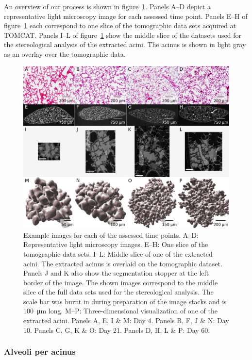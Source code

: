 \documentclass[
  american,
]{article}
\begin{document}
An overview of our process is shown in figure~\ref{fig:01}.
Panels A--D depict a representative light microscopy image for each assessed time point.
Panels E--H of figure~\ref{fig:01} each correspond to one slice of the tomographic data sets acquired at TOMCAT.
Panels I--L of figure~\ref{fig:01} show the middle slice of the datasets used for the stereological analysis of the extracted acini.
The acinus is shown in light gray as an overlay over the tomographic data.

\begin{figure}
\hypertarget{fig:01}{%
\centering
\includegraphics{images/fig01.png}
\caption{Example images for each of the assessed time points.
A--D: Representative light microscopy images.
E--H: One slice of the tomographic data sets.
I--L: Middle slice of one of the extracted acini.
The extracted acinus is overlaid on the tomographic dataset.
Panels J and K also show the segmentation stopper at the left border of the image.
The shown images correspond to the middle slice of the full data sets used for the stereological analysis.
The scale bar was burnt in during preparation of the image stacks and is 100~μm long.
M--P: Three-dimensional visualization of one of the extracted acini.
Panels A, E, I \& M: Day 4.
Panels B, F, J \& N: Day 10.
Panels C, G, K \& O: Day 21.
Panels D, H, L \& P: Day 60.}\label{fig:01}
}
\end{figure}

\hypertarget{alveoli-per-acinus}{%
\subsubsection{Alveoli per acinus}\label{alveoli-per-acinus}}
\end{document}
